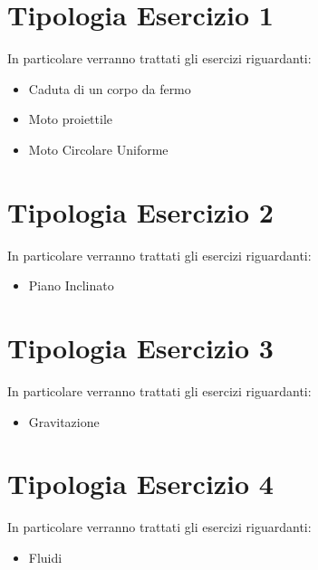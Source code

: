 




\newpage

\tableofcontents

\newpage
\section{Tipologia Esercizio 1}
In particolare verranno trattati gli esercizi riguardanti:
\begin{itemize}
\item Caduta di un corpo da fermo
\item Moto proiettile
\item Moto Circolare Uniforme
\end{itemize}





\clearpage
\newpage
\section{Tipologia Esercizio 2}
In particolare verranno trattati gli esercizi riguardanti:
\begin{itemize}
\item Piano Inclinato 
\end{itemize}





\clearpage
\section{Tipologia Esercizio 3}
In particolare verranno trattati gli esercizi riguardanti:
\begin{itemize}
\item Gravitazione
\end{itemize}




\clearpage

\section{Tipologia Esercizio 4}
In particolare verranno trattati gli esercizi riguardanti:
\begin{itemize}
\item Fluidi
\end{itemize}




\clearpage
